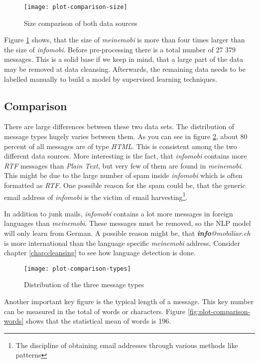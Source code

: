 \begin{figure}[!ht]
    \centering
    \texttt{[image: plot-comparison-size]}
    \caption{Size comparison of both data sources}
    \label{fig:plot-comparison-size}
\end{figure}

Figure \ref{fig:plot-comparison-size} shows, that the size of \emph{meinemobi} is more than four times larger than the size
of \emph{infomobi}. Before pre-processing there is a total number of 27 379 messages. This is a solid base if we
keep in mind, that a large part of the data may be removed at data cleansing. Afterwards, the remaining data needs to be
labelled manually to build a model by supervised learning techniques.

\subsection{Comparison}

There are large differences between these two data sets. The distribution of message types hugely varies between them.
As you can see in figure \ref{fig:plot-comparison-types}, about 80 percent of all messages are of type \emph{HTML}.
This is consistent among the two different data sources. More interesting is the fact, that \emph{infomobi} contains
more \emph{RTF} messages than \emph{Plain Text}, but very few of them are found in \emph{meinemobi}. This might be due to
the large number of spam inside \emph{infomobi} which is often formatted as \emph{RTF}. One possible reason for the spam could be,
that the generic email address of \emph{infomobi} is the victim of email harvesting\footnote{The discipline of obtaining email
addresses through various methods like patterns}.

In addition to junk mails, \emph{infomobi} contains a lot more messages in foreign languages than \emph{meinemobi}. These messages
must be removed, so the NLP model will only learn from German. A possible reason might be, that \emph{\textbf{info}@mobiliar.ch}
is more international than the language specific \emph{meinemobi} address. Consider chapter \ref{chap:cleansing} to see how
language detection is done.

\begin{figure}[!ht]
    \centering
    \texttt{[image: plot-comparison-types]}
    \caption{Distribution of the three message types}
    \label{fig:plot-comparison-types}
\end{figure}

Another important key figure is the typical length of a message. This key number can be measured in the total of words or
characters. Figure \ref{fig:plot-comparison-words} shows that the statistical mean of words is 196.

